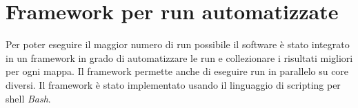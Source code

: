 \chapter*{Framework per run automatizzate}
\label{cha_framework}

Per poter eseguire il maggior numero di run possibile il software è stato integrato in un framework in grado di automatizzare le run e collezionare i risultati migliori per ogni mappa. Il framework permette anche di eseguire run in parallelo su core diversi. Il framework è stato implementato usando il linguaggio di scripting per shell \emph{Bash}. 